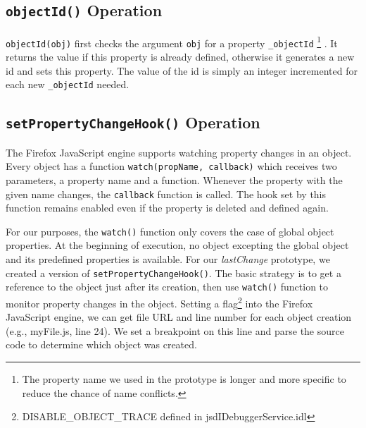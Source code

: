 \documentclass{sig-alternate}
\begin{document}
\subsection{{\normalsize\bf\texttt{objectId()}} Operation}
\texttt{objectId(obj)} first checks the argument \texttt{obj} for a property \texttt{\_objectId}
\footnote[1]{The property name we used in the prototype is longer and more specific to reduce the chance of name conflicts.} .
It returns the value if this property is already defined,
otherwise it generates a new id and sets this property. The value of the id is simply an integer incremented 
for each new \texttt{\_objectId} needed. 



\subsection{{\normalsize\bf\texttt{setPropertyChangeHook()}} Operation}
The Firefox JavaScript engine supports watching property changes in an
object. Every object has a function \texttt{watch(propName, callback)}
which receives two parameters, a property name and a function.  Whenever
the property with the given name changes, the \texttt{callback} function is
called. The hook set by this function remains enabled even if the
property is deleted and defined again. 

For our purposes, the \texttt{watch()} function only covers the case
of global object properties. At the beginning of execution, no object
excepting the global object and its predefined properties is available.  For 
our \textit{lastChange} prototype, we created a version of
\texttt{setPropertyChangeHook()}.  The basic strategy is to get a reference to the object just
after its creation, then use \texttt{watch()} function to monitor
property changes in the object. Setting a flag\footnote[4]{DISABLE\_OBJECT\_TRACE defined in jsdIDebuggerService.idl} into the Firefox 
JavaScript engine, we can get file URL and line number for each object
creation (e.g., myFile.js, line 24). We set a breakpoint on this line
and parse the source code to determine which object was created.
\end{document}
